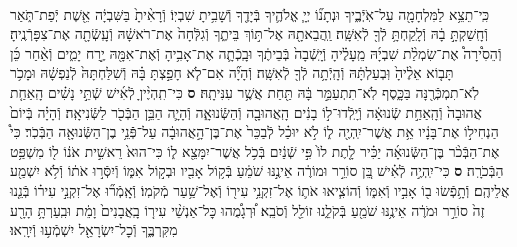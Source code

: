 \documentclass[twoside, openany, parskip=half, 11pt]{book}
\begin{document}
\begin{sometimes}
\begin{footnotesize}
\begin{multicols}{2}
\\
כִּֽי־תֵצֵ֥א לַמִּלְחָמָ֖ה עַל־אֹֽיְֿבֶ֑יךָ וּנְתָנ֞וֹ יְיָ֧ אֱלֹהֶ֛יךָ בְּֿיָדֶ֖ךָ וְֿשָׁבִ֥יתָ שִׁבְיֽוֹ׃ וְֿרָאִ֨יתָ֙ בַּשִּׁבְיָ֔ה אֵ֖שֶׁת יְֿפַת־תֹּ֑אַר וְֿחָֽשַׁקְתָּ֣ בָ֔הּ וְֿלָֽקַחְתָּ֥ לְֿךָ֖ לְֿאִשָּֽׁה׃ וַֽהֲבֵאתָ֖הּ אֶל־תּ֣וֹךְ בֵּיתֶ֑ךָ וְֿגִלְּֿחָה֙ אֶת־רֹאשָׁ֔הּ וְֿעָֽשְֿׂתָ֖ה אֶת־צִפָּרְֿנֶֽיהָ׃ וְֿהֵסִ֩ירָה֩ אֶת־שִׂמְלַ֨ת שִׁבְיָ֜הּ מֵֽעָלֶ֗יהָ וְֿיָֽשְֿׁבָה֙ בְּֿבֵיתֶ֔ךָ וּבָֽכְֿתָ֛ה אֶת־אָבִ֥יהָ וְֿאֶת־אִמָּ֖הּ יֶ֣רַח יָמִ֑ים וְֿאַ֨חַר כֵּ֜ן תָּב֤וֹא אֵלֶ֨יהָ֙ וּֽבְעַלְתָּ֔הּ וְֿהָֽיְֿתָ֥ה לְֿךָ֖ לְֿאִשָּֽׁה׃ וְֿהָיָ֞ה אִם־לֹ֧א חָפַ֣צְתָּ בָּ֗הּ וְֿשִׁלַּחְתָּהּ֙ לְֿנַפְשָׁ֔הּ וּמָכֹ֥ר לֹֽא־תִמְכְּֿרֶ֖נָּה בַּכָּ֑סֶף לֹֽא־תִתְעַמֵּ֣ר בָּ֔הּ תַּ֖חַת אֲשֶׁ֥ר עִנִּיתָֽהּ׃ \textbf{ס}
כִּי־תִֽהְיֶ֨יןָ לְֿאִ֜ישׁ שְֿׁתֵּ֣י נָשִׁ֗ים הָֽאַחַ֤ת אֲהוּבָה֙ וְֿהָֽאַחַ֣ת שְֿׂנוּאָ֔ה וְֿיָֽלְֿדוּ־ל֣וֹ בָנִ֔ים הָֽאֲהוּבָ֖ה וְֿהַשְּֿׂנוּאָ֑ה וְֿהָיָ֛ה הַבֵּ֥ן הַבְּֿכֹ֖ר לַשְּֿׂנִיאָֽה׃ וְֿהָיָ֗ה בְּֿיוֹם֙ הַנְחִיל֣וֹ אֶת־בָּנָ֔יו אֵ֥ת אֲשֶׁר־יִֽהְיֶ֖ה ל֑וֹ לֹ֣א יוּכַ֗ל לְֿבַכֵּר֙ אֶת־בֶּן־הָ֣אֲהוּבָ֔ה עַל־פְּֿֿנֵ֥י בֶן־הַשְּֿׂנוּאָ֖ה הַבְּֿכֹֽר׃ כִּי֩ אֶת־הַבְּֿכֹ֨ר בֶּן־הַשְּֿׂנוּאָ֜ה יַכִּ֗יר לָ֤תֶת לוֹ֙ פִּ֣י שְֿׁנַ֔יִם בְּֿכֹ֥ל אֲשֶׁר־יִמָּצֵ֖א ל֑וֹ כִּי־הוּא֙ רֵאשִׁ֣ית אֹנ֔וֹ ל֖וֹ מִשְׁפַּ֥ט הַבְּֿכֹרָֽה׃ \textbf{ס}
כִּי־יִֽהְיֶ֣ה לְֿאִ֗ישׁ בֵּ֚ן סוֹרֵ֣ר וּמוֹרֶ֔ה אֵינֶ֣נּוּ שֹׁמֵ֔עַ בְּֿק֥וֹל אָבִ֖יו וּבְק֣וֹל אִמּ֑וֹ וְֿיִסְּֿר֣וּ אֹת֔וֹ וְֿלֹ֥א יִשְׁמַ֖ע אֲלֵיהֶֽם׃ וְֿתָ֥פְֿשׂוּ ב֖וֹ אָבִ֣יו וְֿאִמּ֑וֹ וְֿהוֹצִ֧יאוּ אֹת֛וֹ אֶל־זִקְנֵ֥י עִיר֖וֹ וְֿאֶל־שַׁ֥עַר מְֿקֹמֽוֹ׃ וְֿאָֽמְֿר֞וּ אֶל־זִקְנֵ֣י עִיר֗וֹ בְּֿנֵ֤נוּ זֶה֙ סוֹרֵ֣ר וּמֹרֶ֔ה אֵינֶ֥נּוּ שֹׁמֵ֖עַ בְּֿקֹלֵ֑נוּ זוֹלֵ֖ל וְֿסֹבֵֽא׃ וּ֠רְגָמֻ֠הוּ כׇּל־אַנְשֵׁ֨י עִיר֤וֹ בָֽאֲבָנִים֙ וָמֵ֔ת וּבִֽעַרְתָּ֥ הָרָ֖ע מִקִּרְבֶּ֑ךָ וְֿכׇל־יִשְׂרָאֵ֖ל יִשְׁמְֿע֥וּ וְֿיִרָֽאוּ׃


\end{multicols}
\end{footnotesize}
\end{sometimes}
\end{document}
